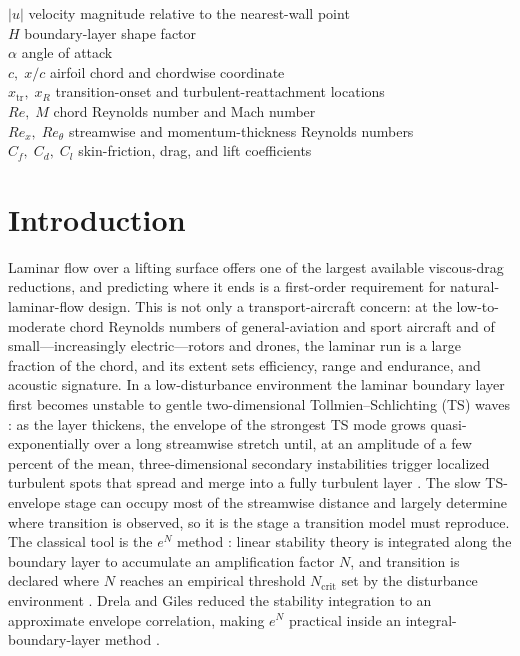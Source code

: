 \documentclass[journal]{new-aiaa}
\begin{document}
\begin{tabbing}
  $|u|$ \> velocity magnitude relative to the nearest-wall point \\
  $H$ \> boundary-layer shape factor \\
  $\alpha$ \> angle of attack \\
  $c,\;x/c$ \> airfoil chord and chordwise coordinate \\
  $x_\mathrm{tr},\;x_R$ \> transition-onset and turbulent-reattachment locations \\
  $Re,\;M$ \> chord Reynolds number and Mach number \\
  $Re_x,\;Re_\theta$ \> streamwise and momentum-thickness Reynolds numbers \\
  $C_f,\;C_d,\;C_l$ \> skin-friction, drag, and lift coefficients \\
\end{tabbing}

\section{Introduction}

Laminar flow over a lifting surface offers one of the largest available
viscous-drag reductions, and predicting where it ends is a first-order requirement
for natural-laminar-flow design. This is not only a transport-aircraft concern:
at the low-to-moderate chord Reynolds numbers of general-aviation and sport
aircraft and of small---increasingly electric---rotors and drones, the laminar run
is a large fraction of the chord, and its extent sets efficiency, range and
endurance, and acoustic signature.
In a low-disturbance environment the laminar boundary layer first becomes
unstable to gentle two-dimensional Tollmien--Schlichting (TS) waves
\cite{mack_1977,schmid_henningson_2001}: as the layer thickens, the envelope of the
strongest TS mode grows quasi-exponentially over a long streamwise stretch until,
at an amplitude of a few percent of the mean, three-dimensional secondary
instabilities trigger localized turbulent spots that spread and merge into a fully
turbulent layer \cite{schubauer_klebanoff_1956,schmid_henningson_2001}. The slow
TS-envelope stage can occupy most of the streamwise distance and largely determine
where transition is observed, so it is the stage a transition model must reproduce.
The classical tool is the $e^N$ method \cite{smith_gamberoni_1956, vaningen_2008}:
linear stability theory is integrated along the boundary layer to accumulate an
amplification factor $N$, and transition is declared where $N$ reaches an empirical
threshold $N_\mathrm{crit}$ set by the disturbance environment \cite{mack_1977}.
Drela and Giles reduced the stability integration to an approximate envelope
correlation, making $e^N$ practical inside an integral-boundary-layer method
\cite{drela_giles_1987, drela_xfoil_1989}.
\end{document}
